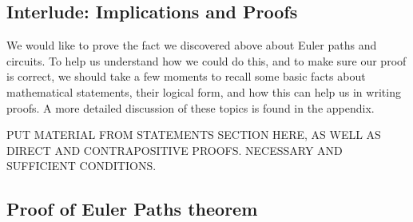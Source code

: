 \documentclass[10pt,]{book}
\theoremstyle{plain}
\theoremstyle{definition}
\theoremstyle{definition}
\theoremstyle{definition}
\theoremstyle{definition}
\numberwithin{equation}{chapter}
\begin{document}
\subsection[{Interlude: Implications and Proofs}]{Interlude: Implications and Proofs}\label{subsection-1}
\hypertarget{p-153}{}%
We would like to prove the fact we discovered above about Euler paths and circuits.  To help us understand how we could do this, and to make sure our proof is correct, we should take a few moments to recall some basic facts about mathematical statements, their logical form, and how this can help us in writing proofs.  A more detailed discussion of these topics is found in the appendix.%
\par
\hypertarget{p-154}{}%
PUT MATERIAL FROM STATEMENTS SECTION HERE, AS WELL AS DIRECT AND CONTRAPOSITIVE PROOFS. NECESSARY AND SUFFICIENT CONDITIONS.%
\typeout{************************************************}
\typeout{************************************************}
\subsection[{Proof of Euler Paths theorem}]{Proof of Euler Paths theorem}\label{subsection-2}
\typeout{************************************************}
\typeout{************************************************}
\end{document}
